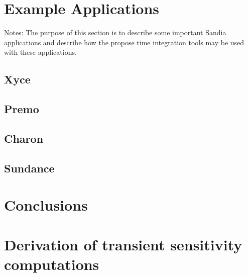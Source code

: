 \documentclass[pdf,ps2pdf,11pt]{SANDreport}
\begin{document}
%
%

\section{Example Applications}

Notes: The purpose of this section is to describe some important Sandia
applications and describe how the propose time integration tools may be used
with these applications.

\subsection{Xyce}

\subsection{Premo}

\subsection{Charon}

\subsection{Sundance}

\section{Conclusions}

%
\clearpage



%
\appendix

\section{Derivation of transient sensitivity computations}
\label{rythmos:app:sens-derivations}
\end{document}
